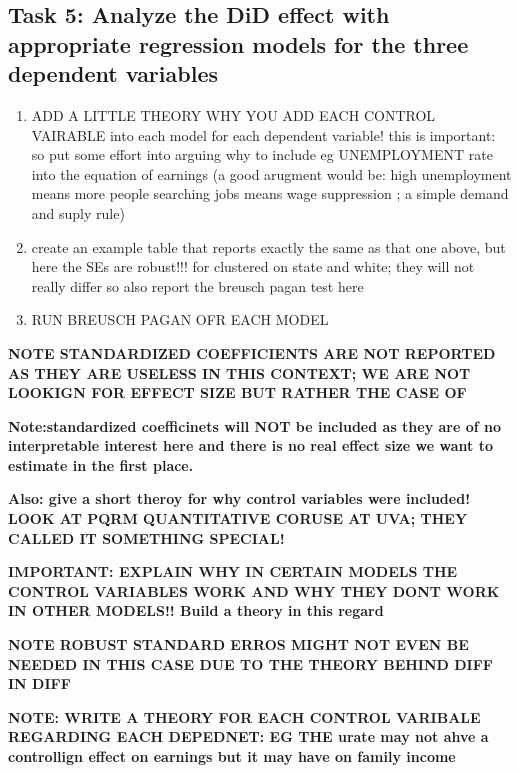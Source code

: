\documentclass[a4paper]{article}
\begin{document}
\subsection{Task 5: Analyze the DiD effect with appropriate regression models for the three
dependent variables}

\begin{enumerate}
   \item ADD A LITTLE THEORY WHY YOU ADD EACH CONTROL VAIRABLE into each model for each dependent variable! this is important: so put some effort into arguing why to include eg UNEMPLOYMENT rate into the equation of earnings (a good arugment would be: high unemployment means more people searching jobs means wage suppression ; a simple demand and suply rule)
   \item create an example table that reports exactly the same as that one above, but here the SEs are robust!!! for clustered on state and white; they will not really differ so also report the breusch pagan test here
   \item RUN BREUSCH PAGAN OFR EACH MODEL
\end{enumerate}


\textbf{NOTE STANDARDIZED COEFFICIENTS ARE NOT REPORTED AS THEY ARE USELESS IN THIS CONTEXT; WE ARE NOT LOOKIGN FOR EFFECT SIZE BUT RATHER THE CASE OF }


\textbf{Note:standardized coefficinets will NOT be included as they are of no interpretable interest here and there is no real effect size we want to estimate in the first place.}

\textbf{Also: give a short theroy for why control variables were included! LOOK AT PQRM QUANTITATIVE CORUSE AT UVA; THEY CALLED IT SOMETHING SPECIAL!}

\textbf{IMPORTANT: EXPLAIN WHY IN CERTAIN MODELS THE CONTROL VARIABLES WORK AND WHY THEY DONT WORK IN OTHER MODELS!! Build a theory in this regard }

\textbf{NOTE ROBUST STANDARD ERROS MIGHT NOT EVEN BE NEEDED IN THIS CASE DUE TO THE THEORY BEHIND DIFF IN DIFF }

\textbf{NOTE: WRITE A THEORY FOR EACH CONTROL VARIBALE REGARDING EACH DEPEDNET: EG THE urate may not ahve a controllign effect on earnings but it may have on family income }

\pagebreak
\end{document}
